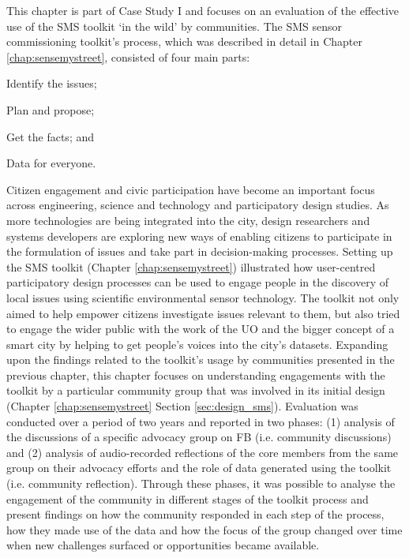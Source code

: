 This chapter is part of Case Study I and focuses on an evaluation of the effective use of the SMS toolkit `in the wild' by communities. The SMS sensor commissioning toolkit's process, which was described in detail in Chapter \ref{chap:sensemystreet}, consisted of four main parts: 
\begin{enumerate*}[label=(\arabic*)]
\item Identify the issues;
\item Plan and propose;
\item Get the facts; and
\item Data for everyone.
\end{enumerate*}
Citizen engagement and civic participation have become an important focus across engineering, science and technology and participatory design studies. As more technologies are being integrated into the city, design researchers and systems developers are exploring new ways of enabling citizens to participate in the formulation of issues and take part in decision-making processes. Setting up the SMS toolkit (Chapter \ref{chap:sensemystreet}) illustrated how user-centred participatory design processes can be used to engage people in the discovery of local issues using scientific environmental sensor technology. The toolkit not only aimed to help empower citizens investigate issues relevant to them, but also tried to engage the wider public with the work of the UO and the bigger concept of a smart city by helping to get people's voices into the city's datasets. Expanding upon the findings related to the toolkit's usage by communities presented in the previous chapter, this chapter focuses on understanding engagements with the toolkit by a particular community group that was involved in its initial design (Chapter \ref{chap:sensemystreet} Section \ref{sec:design_sms}). Evaluation was conducted over a period of two years and reported in two phases: (1) analysis of the discussions of a specific advocacy group on FB (i.e. community discussions) and (2) analysis of audio-recorded reflections of the core members from the same group on their advocacy efforts and the role of data generated using the toolkit (i.e. community reflection). Through these phases, it was possible to analyse the engagement of the community in different stages of the toolkit process and present findings on how the community responded in each step of the process, how they made use of the data and how the focus of the group changed over time when new challenges surfaced or opportunities became available.
\clearpage

